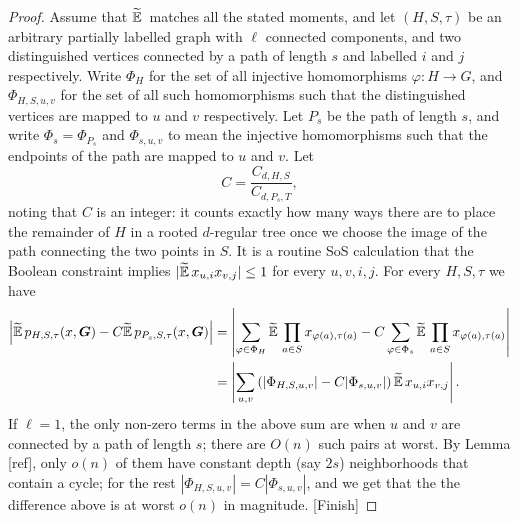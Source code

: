 \begin{proof}
    Assume that $\widetilde{\operatorname*{\mathbb{E}}}\,$ matches all the stated moments, and let $(H,S,\tau)$ be an arbitrary partially labelled graph with $\ell$ connected components, and two distinguished vertices connected by a path of length $s$ and labelled $i$ and $j$ respectively. Write $\Phi_H$ for the set of all injective homomorphisms $\varphi: H \to G$, and $\Phi_{H,S,u,v}$ for the set of all such homomorphisms such that the distinguished vertices are mapped to $u$ and $v$ respectively. Let $P_s$ be the path of length $s$, and write $\Phi_s = \Phi_{P_s}$ and $\Phi_{s,u,v}$ to mean the injective homomorphisms such that the endpoints of the path are mapped to $u$ and $v$. Let
    $$
        C = \frac{C_{d,H,S}}{C_{d,P_s,T}},
    $$
    noting that $C$ is an integer: it counts exactly how many ways there are to place the remainder of $H$ in a rooted $d$-regular tree once we choose the image of the path connecting the two points in $S$. It is a routine SoS calculation that the Boolean constraint implies $|\widetilde{\operatorname*{\mathbb{E}}}\, x_{u,i}x_{v,j}| \le 1$ for every $u,v,i,j$. For every $H,S,\tau$ we have
    \begin{align*}
        \left|\widetilde{\operatorname*{\mathbb{E}}}\, p_{H,S,\tau}(x,\boldsymbol{G}) - C\widetilde{\operatorname*{\mathbb{E}}}\, p_{P_s,S,\tau}(x,\boldsymbol{G}) \right|
        &= \left|\sum_{\varphi \in \Phi_H}\widetilde{\operatorname*{\mathbb{E}}}\, \prod_{a\in S} x_{\varphi(a),\tau(a)} - C\sum_{\varphi \in \Phi_s}\widetilde{\operatorname*{\mathbb{E}}}\, \prod_{a\in S}x_{\varphi(a),\tau(a)}\right| \\
        &= \left|\sum_{u,v}\left(|\Phi_{H,S,u,v}| - C|\Phi_{s,u,v}|\right)\widetilde{\operatorname*{\mathbb{E}}}\, x_{u,i}x_{v,j}\right|.
    \end{align*}
    If $\ell = 1$, the only non-zero terms in the above sum are when $u$ and $v$ are connected by a path of length $s$; there are $O(n)$ such pairs at worst. By Lemma [ref], only $o(n)$ of them have constant depth (say $2s$) neighborhoods that contain a cycle; for the rest $|\Phi_{H,S,u,v}| = C|\Phi_{s,u,v}|$, and we get that the the difference above is at worst $o(n)$ in magnitude. [Finish]
\end{proof}
    
